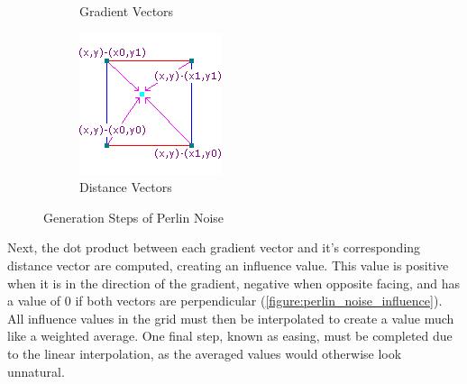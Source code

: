 \begin{figure}
\begin{subfigure}[b]{0.29\textwidth}
        \caption{Gradient Vectors}
        \label{figure:perlin_noise_gradient_vector}
    \end{subfigure}
    \begin{subfigure}[b]{0.29\textwidth}
        \centering
        \includegraphics[width=\textwidth]{figures/body/methodology/perlin_noise_gradient_distance.png}
        \caption{Distance Vectors}
        \label{figure:perlin_noise_gradient_distance}
    \end{subfigure}
    \caption{Generation Steps of Perlin Noise \cite{biagioli_2014}}
    \label{figure:perlin_noise_generation}
\end{figure}

Next, the dot product between each gradient vector and it's corresponding distance vector are computed, creating an influence value. This value is positive when it is in the direction of the gradient, negative when opposite facing, and has a value of 0 if both vectors are perpendicular (\autoref{figure:perlin_noise_influence}). All influence values in the grid must then be interpolated to create a value much like a weighted average. One final step, known as easing, must be completed due to the linear interpolation, as the averaged values would otherwise look unnatural. 

\hfill

